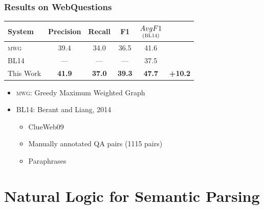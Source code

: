 \documentclass[mathserif,12pt]{beamer}
\newcommand \mwg{\textsc{mwg}\xspace}
\newcommand \webq{WebQuestions\xspace}
\begin{document}
\begin{frame}
\frametitle{Results on \webq}
\begin{table}
\begin{tabular}{|l| c c c c c|}   
  \hline
  System  & Precision & Recall & F1 & $\underset{(\textsc{BL14})}{Avg F1}$ & \\
  \hline
  \textsc{mwg} & 39.4 & 34.0 & 36.5 & 41.6 & \\
  \textsc{BL14} & --- & --- & --- & 37.5 & \\
  This Work  & \bf 41.9 & \bf 37.0 & \bf 39.3 & \bf 47.7 &  \color{blue} \bf +10.2 \\
  \hline
\end{tabular}
\end{table}


\begin{itemize}
  \setlength\itemsep{1em}
  \item {\color{blue!70} \mwg:} Greedy Maximum Weighted Graph
  
  \item {\color{blue!70} \textsc{BL14:}} Berant and Liang, 2014
  \begin{itemize}
    \item ClueWeb09
    \item Manually annotated QA pairs (1115 pairs)
    \item Paraphrases
  \end{itemize} 
\end{itemize}
\end{frame}

\section{Natural Logic for Semantic Parsing}
\end{document}
